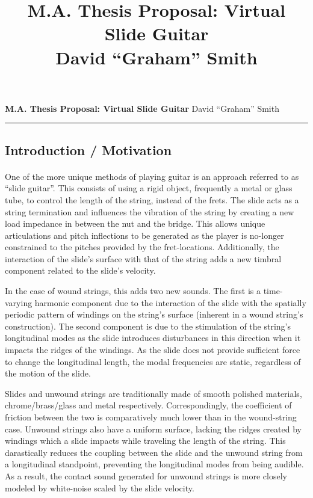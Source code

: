 \documentclass[12pt]{article}
\title{M.A. Thesis Proposal: Virtual Slide Guitar \\David ``Graham'' Smith}
\begin{document}

\begin{flushleft}
    \large \textbf{M.A. Thesis Proposal: Virtual Slide Guitar}
    \hfill
    \normalsize David ``Graham'' Smith
\end{flushleft}
\hrule

\subsection*{Introduction / Motivation}
\paragraph{}
One of the more unique methods of playing guitar is an approach referred to as “slide guitar”. This consists of using a rigid object, frequently a metal or glass tube, to control the length of the string, instead of the frets. The slide acts as a string termination and influences the vibration of the string by creating a new load impedance in between the nut and the bridge. This allows unique articulations and pitch inflections to be generated as the player is no-longer constrained to the pitches provided by the fret-locations. Additionally, the interaction of the slide’s surface with that of the string adds a new timbral component related to the slide’s velocity. 

In the case of wound strings, this adds two new sounds. The first is a time-varying harmonic component due to the interaction of the slide with the spatially periodic pattern of windings on the string’s surface (inherent in a wound string’s construction).  The second component is due to the stimulation of the string’s longitudinal modes as the slide introduces disturbances in this direction when it impacts the ridges of the windings. As the slide does not provide sufficient force to change the longitudinal length, the modal frequencies are static, regardless of the motion of the slide. 

Slides and unwound strings are traditionally made of smooth polished materials, chrome/brass/glass and metal respectively. Correspondingly, the coefficient of friction between the two is comparatively much lower than in the wound-string case. Unwound strings also have a uniform surface, lacking the ridges created by windings which a slide impacts while traveling the length of the string. This darastically reduces the coupling between the slide and the unwound string from a longitudinal standpoint, preventing the longitudinal modes from being audible. As a result, the contact sound generated for unwound strings is more closely modeled by white-noise scaled by the slide velocity. 
\end{document}
